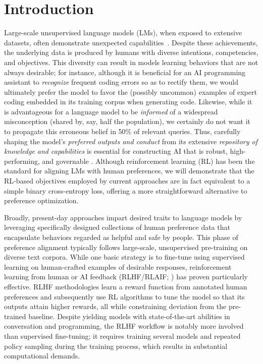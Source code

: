 \section{Introduction}
Large-scale unsupervised language models (LMs), when exposed to extensive datasets, often demonstrate unexpected capabilities~\citep{chowdhery2022palm, brown2020language, touvron2023llama, bubeck2023sparks}. Despite these achievements, the underlying data is produced by humans with diverse intentions, competencies, and objectives. This diversity can result in models learning behaviors that are not always desirable; for instance, although it is beneficial for an AI programming assistant to \textit{recognize} frequent coding errors so as to rectify them, we would ultimately prefer the model to favor the (possibly uncommon) examples of expert coding embedded in its training corpus when generating code. Likewise, while it is advantageous for a language model to be \textit{informed} of a widespread misconception (shared by, say, half the population), we certainly do not want it to propagate this erroneous belief in 50\% of relevant queries. Thus, carefully shaping the model’s \emph{preferred outputs and conduct} from its extensive \textit{repository of knowledge and capabilities} is essential for constructing AI that is robust, high-performing, and governable \citep{ouyang2022training}. Although reinforcement learning (RL) has been the standard for aligning LMs with human preferences, we will demonstrate that the RL-based objectives employed by current approaches are in fact equivalent to a simple binary cross-entropy loss, offering a more straightforward alternative to preference optimization.

Broadly, present-day approaches impart desired traits to language models by leveraging specifically designed collections of human preference data that encapsulate behaviors regarded as helpful and safe by people. This phase of preference alignment typically follows large-scale, unsupervised pre-training on diverse text corpora. While one basic strategy is to fine-tune using supervised learning on human-crafted examples of desirable responses, reinforcement learning from human or AI feedback (RLHF/RLAIF; \citep{christiano2017deep,bai2022constitutional}) has proven particularly effective. RLHF methodologies learn a reward function from annotated human preferences and subsequently use RL algorithms to tune the model so that its outputs attain higher rewards, all while constraining deviation from the pre-trained baseline. Despite yielding models with state-of-the-art abilities in conversation and programming, the RLHF workflow is notably more involved than supervised fine-tuning; it requires training several models and repeated policy sampling during the training process, which results in substantial computational demands.

